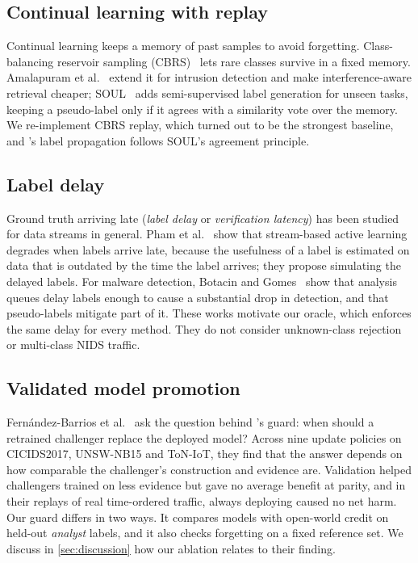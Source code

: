 \subsection{Continual learning with replay}
Continual learning keeps a memory of past samples to avoid forgetting. Class-balancing reservoir sampling
(CBRS)~\cite{chrysakis2020online} lets rare classes survive in a fixed memory. Amalapuram et
al.~\cite{amalapuram2023augmented} extend it for intrusion detection and make interference-aware retrieval
cheaper; SOUL~\cite{amalapuram2024soul} adds semi-supervised label generation for unseen tasks, keeping a
pseudo-label only if it agrees with a similarity vote over the memory. We re-implement CBRS replay, which turned
out to be the strongest baseline, and \nova{}'s label propagation follows SOUL's agreement principle.

\subsection{Label delay}
Ground truth arriving late (\emph{label delay} or \emph{verification latency}) has been studied for data streams in
general. Pham et al.~\cite{pham2022stream} show that stream-based active learning degrades when labels arrive
late, because the usefulness of a label is estimated on data that is outdated by the time the label arrives; they
propose simulating the delayed labels. For malware detection, Botacin and Gomes~\cite{botacin2025label} show that
analysis queues delay labels enough to cause a substantial drop in detection, and that pseudo-labels mitigate part
of it. These works motivate our oracle, which enforces the same delay for every method. They do not consider
unknown-class rejection or multi-class NIDS traffic.

\subsection{Validated model promotion}
Fern{\'a}ndez-Barrios et al.~\cite{fernandezbarrios2026candidate} ask the question behind \nova{}'s guard: when should
a retrained challenger replace the deployed model? Across nine update policies on CICIDS2017, UNSW-NB15 and ToN-IoT,
they find that the answer depends on how comparable the challenger's construction and evidence are. Validation
helped challengers trained on less evidence but gave no average benefit at parity, and in their replays of real
time-ordered traffic, always deploying caused no net harm. Our guard differs in two ways. It compares models with
open-world credit on held-out \emph{analyst} labels, and it also checks forgetting on a fixed reference set. We
discuss in \cref{sec:discussion} how our ablation relates to their finding.

